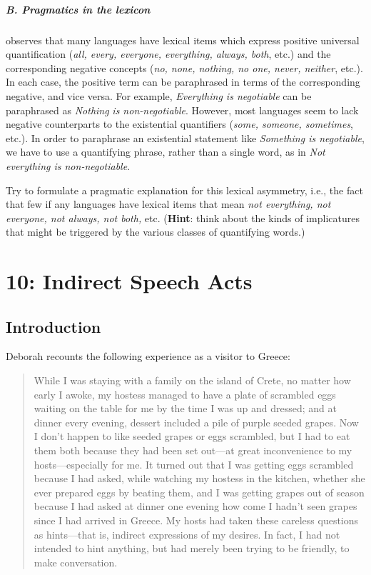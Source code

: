 \paragraph{B. Pragmatics in the lexicon}

\citet{Horn1972} observes that many languages have lexical items which express positive universal quantification (\textit{all, every, everyone, everything, always, both}, etc.) and the corresponding negative concepts (\textit{no, none, nothing, no one, never, neither}, etc.). In each case, the positive term can be paraphrased in terms of the corresponding negative, and vice versa. For example, \textit{Everything is negotiable} can be paraphrased as \textit{Nothing} \textit{is non-negotiable}. However, most languages seem to lack negative counterparts to the existential quantifiers (\textit{some, someone, sometimes}, etc.). In order to paraphrase an existential statement like \textit{Something is negotiable}, we have to use a quantifying phrase, rather than a single word, as in \textit{Not everything is non-negotiable}.

Try to formulate a pragmatic explanation for this lexical asymmetry, i.e., the fact that few if any languages have lexical items that mean \textit{not everything, not everyone, not always, not both,} etc. (\textbf{Hint}: think about the kinds of implicatures that might be triggered by the various classes of quantifying words.)

\chapter{{10}: Indirect Speech Acts}

\section{Introduction}\label{sec:} %

Deborah \citet{Tannen1981} recounts the following experience as a visitor to Greece:


\begin{quote}
While I was staying with a family on the island of Crete, no matter how early I awoke, my hostess managed to have a plate of scrambled eggs waiting on the table for me by the time I was up and dressed; and at dinner every evening, dessert included a pile of purple seeded grapes. Now I don’t happen to like seeded grapes or eggs scrambled, but I had to eat them both because they had been set out—at great inconvenience to my hosts—especially for me. It turned out that I was getting eggs scrambled because I had asked, while watching my hostess in the kitchen, whether she ever prepared eggs by beating them, and I was getting grapes out of season because I had asked at dinner one evening how come I hadn’t seen grapes since I had arrived in Greece. My hosts had taken these careless questions as hints—that is, indirect expressions of my desires. In fact, I had not intended to hint anything, but had merely been trying to be friendly, to make conversation.
\end{quote}


